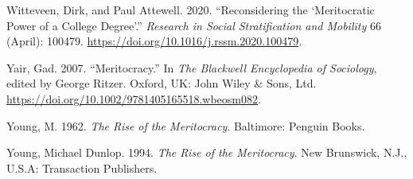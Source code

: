 \documentclass[
]{article}
\begin{document}
\leavevmode\hypertarget{ref-WitteveenReconsideringmeritocraticpower2020a}{}%
Witteveen, Dirk, and Paul Attewell. 2020. ``Reconsidering the
`Meritocratic Power of a College Degree'.'' \emph{Research in Social
Stratification and Mobility} 66 (April): 100479.
\url{https://doi.org/10.1016/j.rssm.2020.100479}.

\leavevmode\hypertarget{ref-yairMeritocracy2007}{}%
Yair, Gad. 2007. ``Meritocracy.'' In \emph{The Blackwell Encyclopedia of
Sociology}, edited by George Ritzer. Oxford, UK: John Wiley \& Sons,
Ltd. \url{https://doi.org/10.1002/9781405165518.wbeosm082}.

\leavevmode\hypertarget{ref-young_rise_1962}{}%
Young, M. 1962. \emph{The Rise of the Meritocracy}. Baltimore: Penguin
Books.

\leavevmode\hypertarget{ref-youngRiseMeritocracy1994}{}%
Young, Michael Dunlop. 1994. \emph{The Rise of the Meritocracy}. New
Brunswick, N.J., U.S.A: Transaction Publishers.
\end{document}
